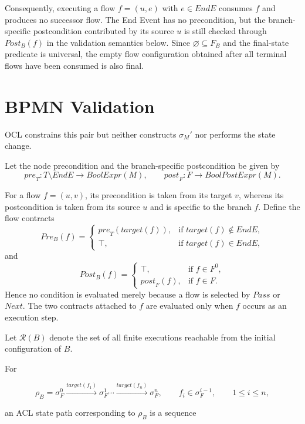 \documentclass[11pt,a4paper]{article}
\newcommand{\EndE}{\mathit{EndE}}
\begin{document}
Consequently, executing a flow $f=(u,e)$ with $e\in\EndE$ consumes $f$
and produces no successor flow. The End Event has no precondition, but the
branch-specific postcondition contributed by its source $u$ is still checked
through $\mathit{Post}_B(f)$ in the validation semantics below. Since
$\varnothing\subseteq F_B$ and the final-state predicate is universal, the
empty flow configuration obtained after all terminal flows have been consumed
is also final.


\section{BPMN Validation}

OCL constrains this pair but neither constructs $\sigma_M'$ nor performs the state change.

Let the node precondition and the branch-specific postcondition be given by
\[
\mathit{pre}_T:
T\setminus\EndE\rightarrow\mathit{BoolExpr}(M),
\qquad
\mathit{post}_F:
F\rightarrow\mathit{BoolPostExpr}(M).
\]

For a flow $f=(u,v)$, its precondition is taken from its target $v$, whereas
its postcondition is taken from its source $u$ and is specific to the branch
$f$. Define the flow contracts
\[
\mathit{Pre}_B(f)=
\left\{
\begin{array}{ll}
\mathit{pre}_T(\mathit{target}(f)),
& \text{if }\mathit{target}(f)\notin\EndE,\\[2mm]
\top,
& \text{if }\mathit{target}(f)\in\EndE,
\end{array}
\right.
\]
and
\[
\mathit{Post}_B(f)=
\left\{
\begin{array}{ll}
\top,
& \text{if } f\in F^{0},\\[2mm]
\mathit{post}_F(f),
& \text{if } f\in F.
\end{array}
\right.
\]
Hence no condition is evaluated merely because a flow is selected by
$\mathit{Pass}$ or $\mathit{Next}$. The two contracts attached to $f$ are
evaluated only when $f$ occurs as an execution step.

Let $\mathcal{R}(B)$ denote the set of all finite executions reachable
from the initial configuration of $B$.

For

\[
\rho_B =
\sigma_F^0
\xrightarrow{\mathit{target}(f_1)}
\sigma_F^1
\cdots
\xrightarrow{\mathit{target}(f_n)}
\sigma_F^n,
\qquad
f_i \in \sigma_F^{i-1},
\qquad
1 \leq i \leq n,
\]

an ACL state path corresponding to $\rho_B$ is a sequence
\end{document}
